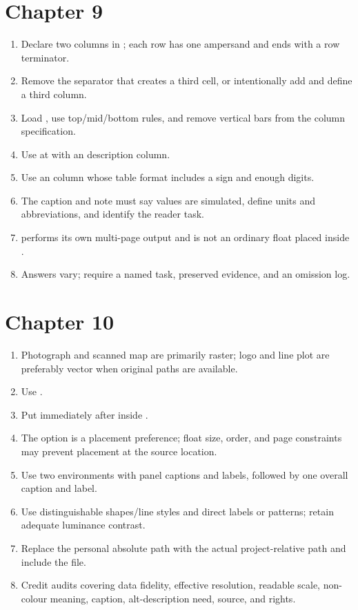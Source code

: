 \section*{Chapter 9}
\begin{enumerate}[label=9.\arabic*,leftmargin=2.4em,itemsep=0.45em]
  \item Declare two columns in ; each row has one ampersand and
        ends with a row terminator.
  \item Remove the separator that creates a third cell, or intentionally add and
        define a third column.
  \item Load , use top/mid/bottom rules, and remove vertical bars
        from the column specification.
  \item Use  at  with an  description column.
  \item Use an  column whose table format includes a sign and enough digits.
  \item The caption and note must say values are simulated, define units and
        abbreviations, and identify the reader task.
  \item {} performs its own multi-page output and is not an ordinary
        float placed inside .
  \item Answers vary; require a named task, preserved evidence, and an omission log.
\end{enumerate}

\section*{Chapter 10}
\begin{enumerate}[label=10.\arabic*,leftmargin=2.4em,itemsep=0.45em]
  \item Photograph and scanned map are primarily raster; logo and line plot are
        preferably vector when original paths are available.
  \item Use 
        .
  \item Put  immediately after  inside .
  \item The option is a placement preference; float size, order, and page
        constraints may prevent placement at the source location.
  \item Use two  environments with panel captions and labels,
        followed by one overall caption and label.
  \item Use distinguishable shapes/line styles and direct labels or patterns;
        retain adequate luminance contrast.
  \item Replace the personal absolute path with the actual project-relative path
        and include the file.
  \item Credit audits covering data fidelity, effective resolution, readable
        scale, non-colour meaning, caption, alt-description need, source, and rights.
\end{enumerate}

